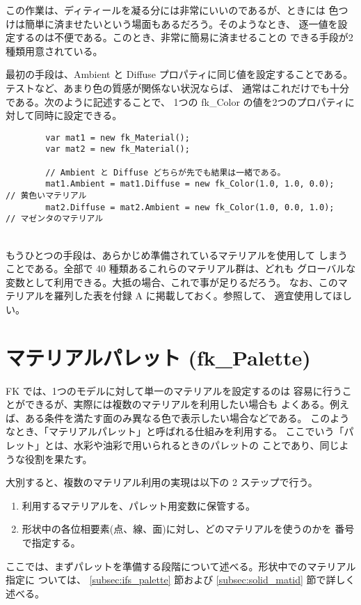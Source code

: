 この作業は、ディティールを凝る分には非常にいいのであるが、ときには
色つけは簡単に済ませたいという場面もあるだろう。そのようなとき、
逐一値を設定するのは不便である。このとき、非常に簡易に済ませることの
できる手段が2種類用意されている。

最初の手段は、Ambient と Diffuse プロパティに同じ値を設定することである。
テストなど、あまり色の質感が関係ない状況ならば、
通常はこれだけでも十分である。次のように記述することで、
1つの fk\_Color の値を2つのプロパティに対して同時に設定できる。
\\
\begin{screen}
\begin{verbatim}
        var mat1 = new fk_Material();
        var mat2 = new fk_Material();

        // Ambient と Diffuse どちらが先でも結果は一緒である。
        mat1.Ambient = mat1.Diffuse = new fk_Color(1.0, 1.0, 0.0);    // 黄色いマテリアル
        mat2.Diffuse = mat2.Ambient = new fk_Color(1.0, 0.0, 1.0);    // マゼンタのマテリアル
\end{verbatim}
\end{screen}
\\
もうひとつの手段は、あらかじめ準備されているマテリアルを使用して
しまうことである。全部で 40 種類あるこれらのマテリアル群は、どれも
グローバルな変数として利用できる。大抵の場合、これで事が足りるだろう。
なお、このマテリアルを羅列した表を付録 A に掲載しておく。参照して、
適宜使用してほしい。
\section{マテリアルパレット (fk\_Palette)} \label{sec:mat_palette}
FK では、1つのモデルに対して単一のマテリアルを設定するのは
容易に行うことができるが、実際には複数のマテリアルを利用したい場合も
よくある。例えば、ある条件を満たす面のみ異なる色で表示したい場合などである。
このようなとき、「マテリアルパレット」と呼ばれる仕組みを利用する。
ここでいう「パレット」とは、水彩や油彩で用いられるときのパレットの
ことであり、同じような役割を果たす。

大別すると、複数のマテリアル利用の実現は以下の 2 ステップで行う。
\begin{enumerate}
 \item 利用するマテリアルを、パレット用変数に保管する。
 \item 形状中の各位相要素(点、線、面)に対し、どのマテリアルを使うのかを
	番号で指定する。
\end{enumerate}
ここでは、まずパレットを準備する段階について述べる。形状中でのマテリアル指定に
ついては、
\ref{subsec:ifs_palette} 節および
\ref{subsec:solid_matid} 節で詳しく述べる。

